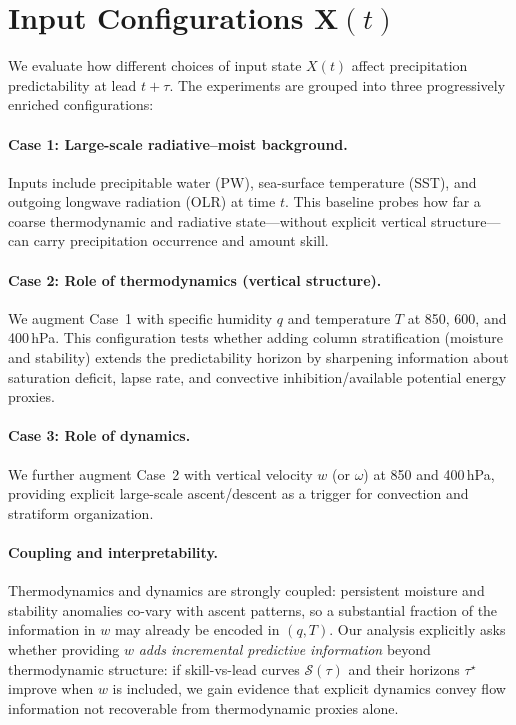\documentclass{article}
\begin{document}
\section{Input Configurations \texorpdfstring{$\mathbf{X}(t)$}{X(t)}}

We evaluate how different choices of input state \(X(t)\) affect precipitation predictability at lead \(t+\tau\). The experiments are grouped into three progressively enriched configurations:

\paragraph{Case 1: Large-scale radiative--moist background.}
Inputs include precipitable water (PW), sea-surface temperature (SST), and outgoing longwave radiation (OLR) at time \(t\).
This baseline probes how far a coarse thermodynamic and radiative state---without explicit vertical structure---can carry precipitation occurrence and amount skill.

\paragraph{Case 2: Role of thermodynamics (vertical structure).}
We augment Case~1 with specific humidity \(q\) and temperature \(T\) at 850, 600, and 400\,hPa.
This configuration tests whether adding column stratification (moisture and stability) extends the predictability horizon by sharpening information about saturation deficit, lapse rate, and convective inhibition/available potential energy proxies.

\paragraph{Case 3: Role of dynamics.}
We further augment Case~2 with vertical velocity \(w\) (or \(\omega\)) at 850 and 400\,hPa, providing explicit large-scale ascent/descent as a trigger for convection and stratiform organization.

\paragraph{Coupling and interpretability.}
Thermodynamics and dynamics are strongly coupled: persistent moisture and stability anomalies co-vary with ascent patterns, so a substantial fraction of the information in \(w\) may already be encoded in \((q,T)\).
Our analysis explicitly asks whether providing \(w\) \emph{adds incremental predictive information} beyond thermodynamic structure: if skill-vs-lead curves \(\mathcal{S}(\tau)\) and their horizons \(\tau^\star\) improve when \(w\) is included, we gain evidence that explicit dynamics convey flow information not recoverable from thermodynamic proxies alone.
\end{document}
